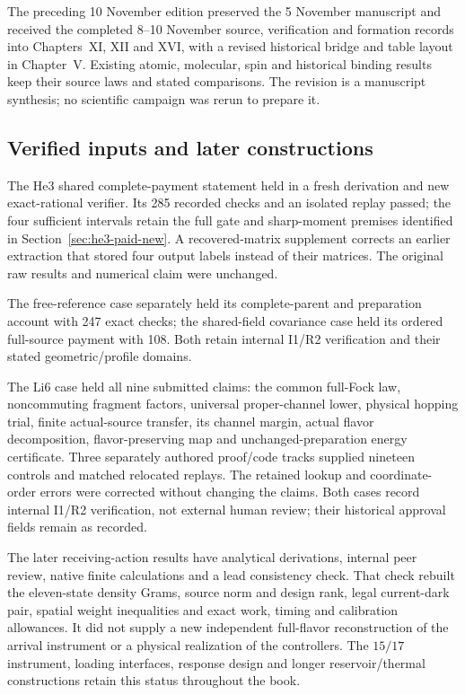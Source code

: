 \label{app:evidence-nov}

The preceding 10 November edition preserved the 5 November manuscript and received the completed 8--10 November source, verification and formation records into Chapters~XI, XII and XVI, with a revised historical bridge
and table layout in Chapter~V. Existing atomic, molecular, spin and
historical binding results keep their source laws and stated comparisons.
The revision is a manuscript synthesis; no scientific campaign was rerun
to prepare it.

\subsection{Verified inputs and later constructions}

The He3 shared complete-payment statement held in a fresh derivation and
new exact-rational verifier. Its 285 recorded checks and an isolated replay
passed; the four sufficient intervals retain the full gate and sharp-moment
premises identified in Section~\ref{sec:he3-paid-new}. A recovered-matrix
supplement corrects an earlier extraction that stored four output labels
instead of their matrices. The original raw results and numerical claim
were unchanged.

The free-reference case separately held its complete-parent and
preparation account with 247 exact checks; the shared-field covariance
case held its ordered full-source payment with 108. Both retain internal
I1/R2 verification and their stated geometric/profile domains.

The Li6 case held all nine submitted claims: the common full-Fock law,
noncommuting fragment factors, universal proper-channel lower, physical
hopping trial, finite actual-source transfer, its channel margin, actual
flavor decomposition, flavor-preserving map and unchanged-preparation
energy certificate. Three separately authored proof/code tracks supplied
nineteen controls and matched relocated replays. The retained lookup and
coordinate-order errors were corrected without changing the claims. Both
cases record internal I1/R2 verification, not external human review; their
historical approval fields remain as recorded.

The later receiving-action results have analytical derivations, internal
peer review, native finite calculations and a lead consistency check.
That check rebuilt the eleven-state density Grams, source norm and design
rank, legal current-dark pair, spatial weight inequalities and exact work,
timing and calibration allowances. It did not supply a new independent
full-flavor reconstruction of the arrival instrument or a physical
realization of the controllers. The $15/17$ instrument, loading interfaces,
response design and longer reservoir/thermal constructions retain this
status throughout the book.

